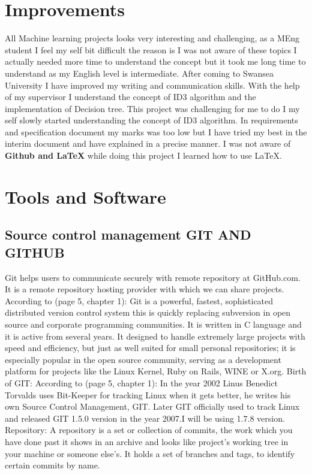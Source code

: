 \documentclass{report}
\begin{document}
\section{Improvements}
\label{sec:imp}

All Machine learning projects looks very interesting and challenging, as a MEng student I feel my self bit difficult the reason is I was not aware of these topics I actually needed more time to understand the concept but it took me long time to understand as my English level is intermediate. After coming to Swansea University I have improved my writing and communication skills.  
With the help of my supervisor I understand the concept of ID3 algorithm and the implementation of Decision tree. 
This project was challenging for me to do I my self slowly started understanding the concept of ID3 algorithm. In requirements and specification document my marks was too low but I have tried my best in the interim document and have explained in a precise manner. I was not aware of {\bf Github and \LaTeX{}} while doing this project I learned how to use \LaTeX{}.

\section{Tools and Software}

\subsection{ Source control management  GIT AND GITHUB}
\label{sec:git}

Git helps users to communicate securely with remote repository at GitHub.com. It is a remote repository hosting provider with which we can share projects.	
According to \cite{Chacon2011ProGit} (page 5, chapter 1): Git is a powerful, fastest, sophisticated distributed version control system this is quickly replacing subversion in open source and corporate programming communities. It is written in C language and it is active from several years. It designed to handle extremely large projects with speed and efficiency,	but just as well suited for small personal repositories; it is especially popular in the open source community, serving as a development platform for projects like the Linux Kernel, Ruby on Rails, WINE or X.org.
Birth of GIT:
According to \cite{Chacon2011ProGit} (page 5, chapter 1): In the year 2002 Linus Benedict Torvalds uses Bit-Keeper for tracking Linux when it gets better, he writes his own Source Control Management, GIT. Later GIT officially used to track Linux and released GIT 1.5.0 version in the year 2007.I will be using 1.7.8 version.
Repository:  A repository is a set or collection of commits, the work which you have done past it shows in an archive and looks like project's working tree in your machine or someone else's. It holds a set of branches and tags, to identify certain commits by name.
\end{document}
